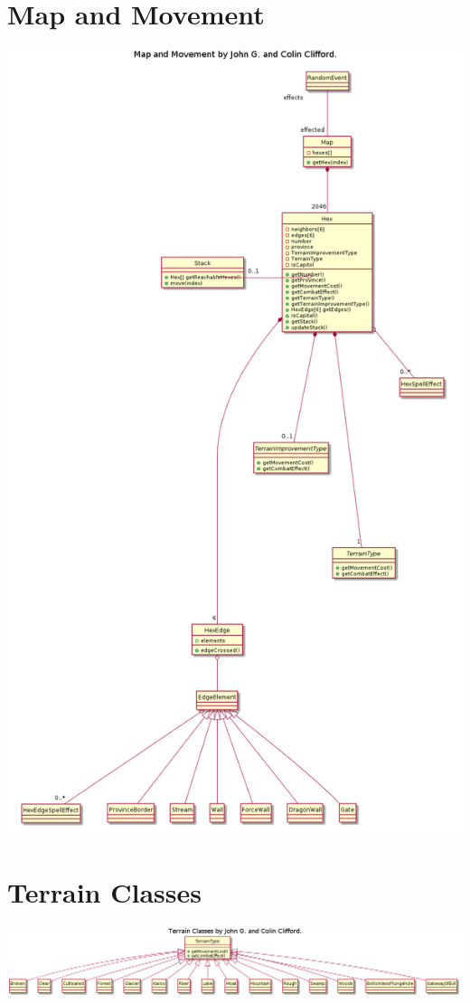 \documentclass{article}
\begin{document}
\section{Map and Movement}
\includegraphics[width=\textwidth]{pngs/Map.png}

\section{Terrain Classes}
\includegraphics[width=\textwidth]{pngs/TerrainClasses.png}
\end{document}

